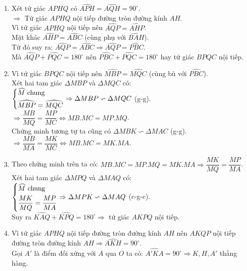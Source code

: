 \begin{vd}
{\begin{center}
\begin{tikzpicture}[scale=0.9]
\end{tikzpicture}
\end{center}
\begin{enumerate}
        \item Xét tứ giác $APHQ$ có $\widehat{APH}=\widehat{AQH}=90^\circ$.\\
        $\Rightarrow $ Tứ giác $APHQ$ nội tiếp đường tròn đường kính $AH$.\\
        Vì tứ giác $APHQ$ nội tiếp nên $\widehat{AQP}=\widehat{AHP}$.\\
        Mặt khác $\widehat{AHP}=\widehat{ABC}$ (cùng phụ với $\widehat{BAH}$).\\
        Từ đó suy ra: $\widehat{AQP}=\widehat{ABC}\Rightarrow \widehat{AQP}=\widehat{PBC}$.\\
        Mà $\widehat{AQP}+\widehat{PQC}=180^\circ$ nên $\widehat{PBC}+\widehat{PQC}=180^\circ$ hay tứ giác $BPQC$ nội tiếp.
        \item Vì tứ giác $BPQC$ nội tiếp nên $\widehat{MBP}=\widehat{MQC}$ (cùng bù với $\widehat{PBC}$).\\
        Xét hai tam giác $\Delta MBP$ và $\Delta MQC$ có:\\
        $\heva{&\widehat{M} \text{ chung}\\&\widehat{MBP}=\widehat{MQC}}\Rightarrow \Delta MBP\backsim\Delta MQC$ (g-g).\\
      $\Rightarrow \dfrac{MB}{MQ}=\dfrac{MP}{MC}\Leftrightarrow MB.MC=MP.MQ$.\\
      Chứng minh tương tự ta cũng có $\Delta MBK\backsim\Delta MAC$ (g-g).\\
      $\Rightarrow \dfrac{MB}{MA}=\dfrac{MK}{MC}\Leftrightarrow MB.MC=MK.MA$.
        \item Theo chứng minh trên ta có: $MB.MC=MP.MQ=MK.MA\Rightarrow \dfrac{MK}{MQ}=\dfrac{MP}{MA}$.\\
        Xét hai tam giác $\Delta MPQ$ và $\Delta MAQ$ có:
         $\heva{&\widehat{M} \text{ chung}\\&\dfrac{MK}{MQ}=\dfrac{MP}{MA}}\Rightarrow \Delta MPK\backsim\Delta MAQ$ (c-g-c).\\
         Suy ra $\widehat{KAQ}+\widehat{KPQ}=180^\circ\Rightarrow$ tứ giác $AKPQ$ nội tiếp.
         \item Vì tứ giác $APHQ$ nội tiếp đường tròn đường kính $AH$ nên $AKQP$ nội tiếp đường tròn đường kính $AH\Rightarrow \widehat{AKH}=90^\circ$.\\
         Gọi $A'$ là điểm đối xứng với $A$ qua $O$ ta có: $\widehat{A'KA}=90^\circ\Rightarrow K,H,A'$ thẳng hàng.\\

\end{enumerate}}
\end{vd}
